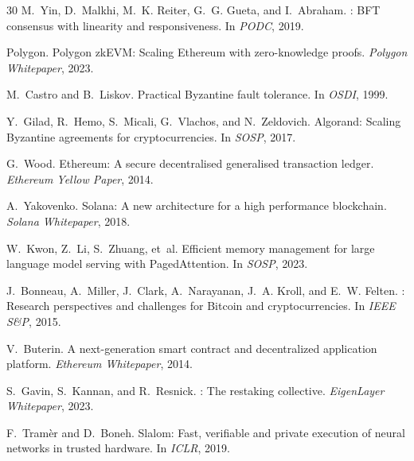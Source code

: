 \begin{thebibliography}{30}
M.~Yin, D.~Malkhi, M.~K. Reiter, G.~G. Gueta, and I.~Abraham.
: {BFT} consensus with linearity and responsiveness.
\newblock In \emph{PODC}, 2019.

Polygon.
\newblock Polygon {zkEVM}: Scaling {Ethereum} with zero-knowledge proofs.
\newblock \emph{Polygon Whitepaper}, 2023.

M.~Castro and B.~Liskov.
\newblock Practical {Byzantine} fault tolerance.
\newblock In \emph{OSDI}, 1999.

Y.~Gilad, R.~Hemo, S.~Micali, G.~Vlachos, and N.~Zeldovich.
\newblock Algorand: Scaling {Byzantine} agreements for cryptocurrencies.
\newblock In \emph{SOSP}, 2017.

G.~Wood.
\newblock Ethereum: A secure decentralised generalised transaction ledger.
\newblock \emph{Ethereum Yellow Paper}, 2014.

A.~Yakovenko.
\newblock Solana: A new architecture for a high performance blockchain.
\newblock \emph{Solana Whitepaper}, 2018.

W.~Kwon, Z.~Li, S.~Zhuang, et~al.
\newblock Efficient memory management for large language model serving with {PagedAttention}.
\newblock In \emph{SOSP}, 2023.

J.~Bonneau, A.~Miller, J.~Clark, A.~Narayanan, J.~A. Kroll, and E.~W. Felten.
: Research perspectives and challenges for {Bitcoin} and cryptocurrencies.
\newblock In \emph{IEEE S\&P}, 2015.

V.~Buterin.
\newblock A next-generation smart contract and decentralized application platform.
\newblock \emph{Ethereum Whitepaper}, 2014.

S.~Gavin, S.~Kannan, and R.~Resnick.
: The restaking collective.
\newblock \emph{EigenLayer Whitepaper}, 2023.

F.~Tram\`er and D.~Boneh.
\newblock Slalom: Fast, verifiable and private execution of neural networks in trusted hardware.
\newblock In \emph{ICLR}, 2019.

\end{thebibliography}

